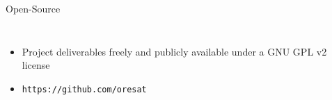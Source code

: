 \documentclass[slidestop,compress]{beamer}
\begin{document}
\begin{frame}[plain]
\begin{block}{\vspace{0.5 cm}

\centering Open-Source}
\begin{columns}
\begin{itemize}
\item Project deliverables freely and publicly available under a GNU GPL v2 license
\item \texttt{https://github.com/oresat}
\end{itemize}
\end{columns}

\vspace{0.5 cm}
\end{block}    
\end{frame}
\end{document}
